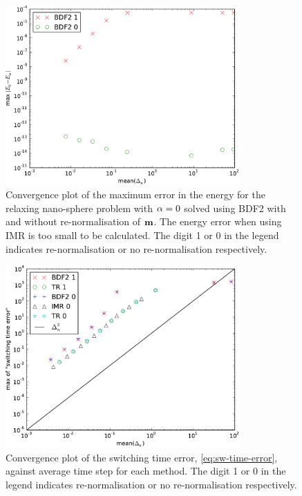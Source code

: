 \begin{figure}
  \centering
  \includegraphics[width=0.8\textwidth]{plots/ode_llg_adaptive_energy/maxabsofenergychangevsmeanofdts}
  \caption{Convergence plot of the maximum error in the energy for the relaxing nano-sphere problem with $\alpha = 0$ solved using BDF2 with and without re-normalisation of $\boldsymbol{\mathrm{m}}$.
The energy error when using IMR is too small to be calculated.
The digit 1 or 0 in the legend indicates re-normalisation or no re-normalisation respectively.
}
  \label{fig:energy-aimr-ode}
\end{figure}

\begin{figure}
  \centering
  \includegraphics[width=0.8\textwidth]{plots/ode_llg_adaptive_convergence/maxofswitchingtimeerrorvsmeanofdts}
  \caption{Convergence plot of the switching time error, \cref{eq:sw-time-error}, against average time step for each method.
    The digit 1 or 0 in the legend indicates re-normalisation or no re-normalisation respectively.
}
  \label{fig:llg-ode-convergence-swtime}
\end{figure}


